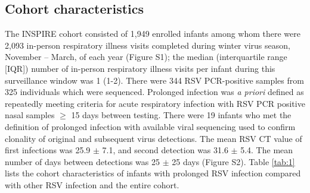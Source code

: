 \documentclass{article} %
\begin{document}
\subsection{Cohort characteristics}
The INSPIRE cohort consisted of 1,949 enrolled infants among whom there were 2,093 in-person respiratory illness visits completed during winter virus season, November – March, of each year (Figure S1); the median (interquartile range [IQR]) number of in-person respiratory illness visits per infant during this surveillance window was 1 (1-2). There were 344 RSV PCR-positive samples from 325 individuals which were sequenced. Prolonged infection was \textit{a priori} defined as repeatedly meeting criteria for acute respiratory infection with RSV PCR positive nasal samples $\ge$ 15 days between testing. There were 19 infants who met the definition of prolonged infection with available viral sequencing used to confirm clonality of original and subsequent virus detections. The mean RSV CT value of first infections was 25.9 $\pm$ 7.1, and second detection was 31.6 $\pm$ 5.4. The mean number of days between detections was 25 $\pm$ 25 days (Figure S2). Table \ref{tab:1} lists the cohort characteristics of infants with prolonged RSV infection compared with other RSV infection and the entire cohort.
 
\end{document}

